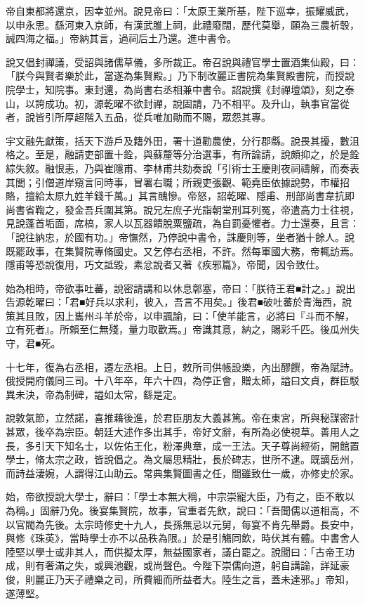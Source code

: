 \begin{pinyinscope}
 帝自東都將還京，因幸並州。說見帝曰：「太原王業所基，陛下巡幸，振耀威武，以申永思。繇河東入京師，有漢武脽上祠，此禮廢闊，歷代莫舉，願為三農祈彀，誠四海之福。」帝納其言，過祠后土乃還。進中書令。



 說又倡封禪議，受詔與諸儒草儀，多所裁正。帝召說與禮官學士置酒集仙殿，曰：「朕今與賢者樂於此，當遂為集賢殿。」乃下制改麗正書院為集賢殿書院，而授說院學士，知院事。東封還，為尚書右丞相兼中書令。詔說撰《封禪壇頌》，刻之泰山，以誇成功。初，源乾曜不欲封禪，說固請，乃不相平。及升山，執事官當從者，說皆引所厚超階入五品，從兵唯加勛而不賜，眾怨其專。



 宇文融先獻策，括天下游戶及籍外田，署十道勸農使，分行郡縣。說畏其擾，數沮格之。至是，融請吏部置十銓，與蘇釐等分治選事，有所論請，說頗抑之，於是銓綜失敘。融恨恚，乃與崔隱甫、李林甫共劾奏說「引術士王慶則夜祠禱解，而奏表其閭；引僧道岸窺言冋時事，冒署右職；所親吏張觀、範堯臣依據說勢，市權招賂，擅給太原九姓羊錢千萬。」其言醜慘。帝怒，詔乾曜、隱甫、刑部尚書韋抗即尚書省鞫之，發金吾兵圍其第。說兄左庶子光詣朝堂刑耳列冤，帝遣高力士往視，見說蓬首垢面，席槁，家人以瓦器饋脫粟鹽疏，為自罰憂懼者。力士還奏，且言：「說往納忠，於國有功。」帝憮然，乃停說中書令，誅慶則等，坐者猶十餘人。說既罷政事，在集賢院專脩國史。又乞停右丞相，不許。然每軍國大務，帝輒訪焉。隱甫等恐說復用，巧文詆毀，素忿說者又著《疾邪篇》，帝聞，因令致仕。



 始為相時，帝欲事吐蕃，說密請講和以休息鄣塞，帝曰：「朕待王君■計之。」說出告源乾曜曰：「君■好兵以求利，彼入，吾言不用矣。」後君■破吐蕃於青海西，說策其且敗，因上巂州斗羊於帝，以申諷諭，曰：「使羊能言，必將曰『斗而不解，立有死者』。所賴至仁無殘，量力取歡焉。」帝識其意，納之，賜彩千匹。後瓜州失守，君■死。



 十七年，復為右丞相，遷左丞相。上日，敕所司供帳設樂，內出醪饌，帝為賦詩。俄授開府儀同三司。十八年卒，年六十四，為停正會，贈太師，謚曰文貞，群臣駁異未決，帝為制碑，謚如太常，繇是定。



 說敦氣節，立然諾，喜推藉後進，於君臣朋友大義甚篤。帝在東宮，所與秘謀密計甚眾，後卒為宗臣。朝廷大述作多出其手，帝好文辭，有所為必使視草。善用人之長，多引天下知名士，以佐佑王化，粉澤典章，成一王法。天子尊尚經術，開館置學士，脩太宗之政，皆說倡之。為文屬思精壯，長於碑志，世所不逮。既謫岳州，而詩益淒婉，人謂得江山助云。常典集賢圖書之任，間雖致仕一歲，亦修史於家。



 始，帝欲授說大學士，辭曰：「學士本無大稱，中宗崇寵大臣，乃有之，臣不敢以為稱。」固辭乃免。後宴集賢院，故事，官重者先飲，說曰：「吾聞儒以道相高，不以官閥為先後。太宗時修史十九人，長孫無忌以元舅，每宴不肯先舉爵。長安中，與修《珠英》，當時學士亦不以品秩為限。」於是引觴同飲，時伏其有體。中書舍人陸堅以學士或非其人，而供擬太厚，無益國家者，議白罷之。說聞曰：「古帝王功成，則有奢滿之失，或興池觀，或尚聲色。今陛下崇儒向道，躬自講論，詳延豪俊，則麗正乃天子禮樂之司，所費細而所益者大。陸生之言，蓋未達邪。」帝知，遂薄堅。




\end{pinyinscope}
